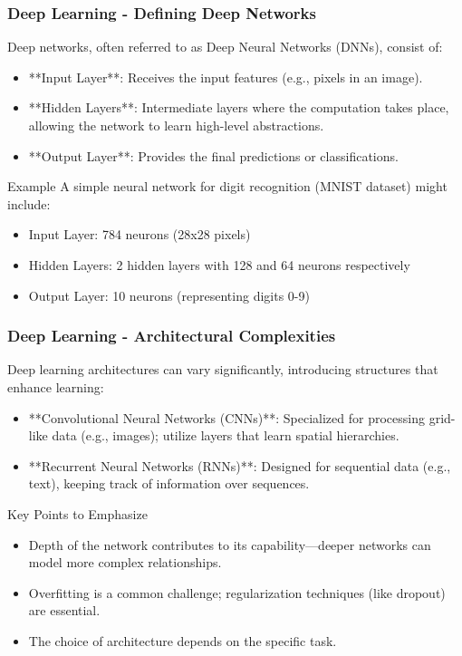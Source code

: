 \documentclass{beamer}
\begin{document}
\begin{frame}[fragile]
    \frametitle{Deep Learning - Defining Deep Networks}
    Deep networks, often referred to as Deep Neural Networks (DNNs), consist of:
    \begin{itemize}
        \item **Input Layer**: Receives the input features (e.g., pixels in an image).
        \item **Hidden Layers**: Intermediate layers where the computation takes place, allowing the network to learn high-level abstractions.
        \item **Output Layer**: Provides the final predictions or classifications.
    \end{itemize}
    
    \begin{block}{Example}
    A simple neural network for digit recognition (MNIST dataset) might include:
    \begin{itemize}
        \item Input Layer: 784 neurons (28x28 pixels)
        \item Hidden Layers: 2 hidden layers with 128 and 64 neurons respectively
        \item Output Layer: 10 neurons (representing digits 0-9)
    \end{itemize}
    \end{block}
\end{frame}

\begin{frame}[fragile]
    \frametitle{Deep Learning - Architectural Complexities}
    Deep learning architectures can vary significantly, introducing structures that enhance learning:
    \begin{itemize}
        \item **Convolutional Neural Networks (CNNs)**: Specialized for processing grid-like data (e.g., images); utilize layers that learn spatial hierarchies.
        \item **Recurrent Neural Networks (RNNs)**: Designed for sequential data (e.g., text), keeping track of information over sequences.
    \end{itemize}
    
    \begin{block}{Key Points to Emphasize}
    \begin{itemize}
        \item Depth of the network contributes to its capability—deeper networks can model more complex relationships.
        \item Overfitting is a common challenge; regularization techniques (like dropout) are essential.
        \item The choice of architecture depends on the specific task.
    \end{itemize}
    \end{block}
\end{frame}
\end{document}
